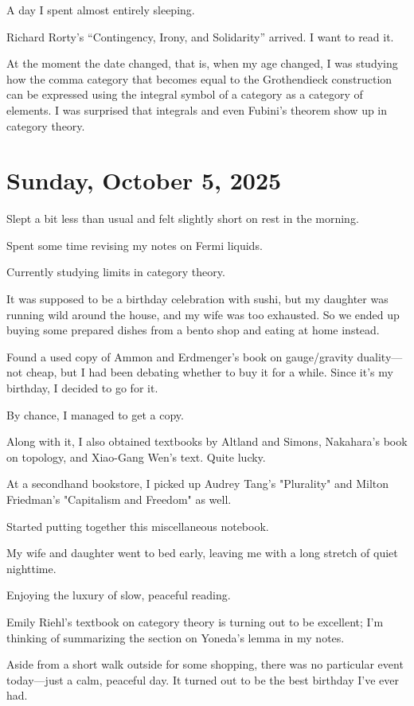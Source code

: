 \documentclass[uplatex]{jsarticle}
\begin{document}
A day I spent almost entirely sleeping.

Richard Rorty's ``Contingency, Irony, and Solidarity'' arrived. I want to read it.

At the moment the date changed, that is, when my age changed, I was studying how the comma category that becomes equal to the Grothendieck construction can be expressed using the integral symbol of a category as a category of elements.
I was surprised that integrals and even Fubini's theorem show up in category theory.


\section{Sunday, October 5, 2025}

Slept a bit less than usual and felt slightly short on rest in the morning.  

Spent some time revising my notes on Fermi liquids.  

Currently studying limits in category theory.  

It was supposed to be a birthday celebration with sushi, but my daughter was running wild around the house, and my wife was too exhausted.  
So we ended up buying some prepared dishes from a bento shop and eating at home instead.  

Found a used copy of Ammon and Erdmenger's book on gauge/gravity duality—not cheap, but I had been debating whether to buy it for a while.  
Since it's my birthday, I decided to go for it.  

By chance, I managed to get a copy.  

Along with it, I also obtained textbooks by Altland and Simons, Nakahara's book on topology, and Xiao-Gang Wen's text.  
Quite lucky.  

At a secondhand bookstore, I picked up Audrey Tang's "Plurality" and Milton Friedman's "Capitalism and Freedom" as well.  

Started putting together this miscellaneous notebook.  

My wife and daughter went to bed early, leaving me with a long stretch of quiet nighttime.  

Enjoying the luxury of slow, peaceful reading.  

Emily Riehl's textbook on category theory is turning out to be excellent; I’m thinking of summarizing the section on Yoneda’s lemma in my notes.  

Aside from a short walk outside for some shopping, there was no particular event today—just a calm, peaceful day.  
It turned out to be the best birthday I’ve ever had.
\end{document}
